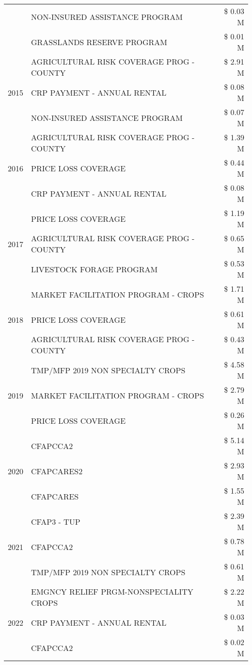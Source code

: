 \begin{tabular}{llr}
 & NON-INSURED ASSISTANCE PROGRAM & \$ 0.03 M \\
 & GRASSLANDS RESERVE PROGRAM & \$ 0.01 M \\
\cline{1-3}
\multirow[t]{3}{*}{2015} & AGRICULTURAL RISK COVERAGE PROG - COUNTY & \$ 2.91 M \\
 & CRP PAYMENT - ANNUAL RENTAL & \$ 0.08 M \\
 & NON-INSURED ASSISTANCE PROGRAM & \$ 0.07 M \\
\cline{1-3}
\multirow[t]{3}{*}{2016} & AGRICULTURAL RISK COVERAGE PROG - COUNTY & \$ 1.39 M \\
 & PRICE LOSS COVERAGE & \$ 0.44 M \\
 & CRP PAYMENT - ANNUAL RENTAL & \$ 0.08 M \\
\cline{1-3}
\multirow[t]{3}{*}{2017} & PRICE LOSS COVERAGE & \$ 1.19 M \\
 & AGRICULTURAL RISK COVERAGE PROG - COUNTY & \$ 0.65 M \\
 & LIVESTOCK FORAGE PROGRAM & \$ 0.53 M \\
\cline{1-3}
\multirow[t]{3}{*}{2018} & MARKET FACILITATION PROGRAM - CROPS & \$ 1.71 M \\
 & PRICE LOSS COVERAGE & \$ 0.61 M \\
 & AGRICULTURAL RISK COVERAGE PROG - COUNTY & \$ 0.43 M \\
\cline{1-3}
\multirow[t]{3}{*}{2019} & TMP/MFP 2019 NON SPECIALTY CROPS & \$ 4.58 M \\
 & MARKET FACILITATION PROGRAM - CROPS & \$ 2.79 M \\
 & PRICE LOSS COVERAGE & \$ 0.26 M \\
\cline{1-3}
\multirow[t]{3}{*}{2020} & CFAPCCA2 & \$ 5.14 M \\
 & CFAPCARES2 & \$ 2.93 M \\
 & CFAPCARES & \$ 1.55 M \\
\cline{1-3}
\multirow[t]{3}{*}{2021} & CFAP3 - TUP & \$ 2.39 M \\
 & CFAPCCA2 & \$ 0.78 M \\
 & TMP/MFP 2019 NON SPECIALTY CROPS & \$ 0.61 M \\
\cline{1-3}
\multirow[t]{3}{*}{2022} & EMGNCY RELIEF PRGM-NONSPECIALITY CROPS & \$ 2.22 M \\
 & CRP PAYMENT - ANNUAL RENTAL & \$ 0.03 M \\
 & CFAPCCA2 & \$ 0.02 M \\
\cline{1-3}
\bottomrule
\end{tabular}
